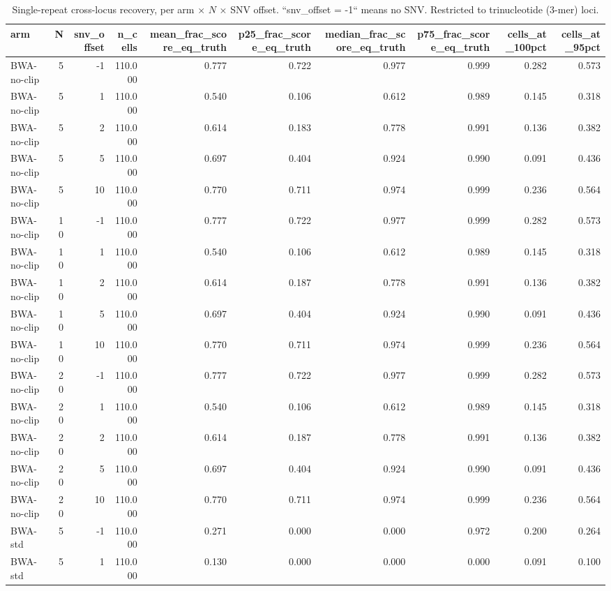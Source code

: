 \begin{table}
\caption{Single-repeat cross-locus recovery, per arm × $N$ × SNV offset.  ``snv\_offset = -1`` means no SNV.  Restricted to trinucleotide (3-mer) loci.}
\label{tab:single-recovery-by-N-snv}
\begin{tabular}{lrrrrrrrrr}
\toprule
arm & N & snv_offset & n_cells & mean_frac_score_eq_truth & p25_frac_score_eq_truth & median_frac_score_eq_truth & p75_frac_score_eq_truth & cells_at_100pct & cells_at_95pct \\
\midrule
BWA-no-clip & 5 & -1 & 110.000 & 0.777 & 0.722 & 0.977 & 0.999 & 0.282 & 0.573 \\
BWA-no-clip & 5 & 1 & 110.000 & 0.540 & 0.106 & 0.612 & 0.989 & 0.145 & 0.318 \\
BWA-no-clip & 5 & 2 & 110.000 & 0.614 & 0.183 & 0.778 & 0.991 & 0.136 & 0.382 \\
BWA-no-clip & 5 & 5 & 110.000 & 0.697 & 0.404 & 0.924 & 0.990 & 0.091 & 0.436 \\
BWA-no-clip & 5 & 10 & 110.000 & 0.770 & 0.711 & 0.974 & 0.999 & 0.236 & 0.564 \\
BWA-no-clip & 10 & -1 & 110.000 & 0.777 & 0.722 & 0.977 & 0.999 & 0.282 & 0.573 \\
BWA-no-clip & 10 & 1 & 110.000 & 0.540 & 0.106 & 0.612 & 0.989 & 0.145 & 0.318 \\
BWA-no-clip & 10 & 2 & 110.000 & 0.614 & 0.187 & 0.778 & 0.991 & 0.136 & 0.382 \\
BWA-no-clip & 10 & 5 & 110.000 & 0.697 & 0.404 & 0.924 & 0.990 & 0.091 & 0.436 \\
BWA-no-clip & 10 & 10 & 110.000 & 0.770 & 0.711 & 0.974 & 0.999 & 0.236 & 0.564 \\
BWA-no-clip & 20 & -1 & 110.000 & 0.777 & 0.722 & 0.977 & 0.999 & 0.282 & 0.573 \\
BWA-no-clip & 20 & 1 & 110.000 & 0.540 & 0.106 & 0.612 & 0.989 & 0.145 & 0.318 \\
BWA-no-clip & 20 & 2 & 110.000 & 0.614 & 0.187 & 0.778 & 0.991 & 0.136 & 0.382 \\
BWA-no-clip & 20 & 5 & 110.000 & 0.697 & 0.404 & 0.924 & 0.990 & 0.091 & 0.436 \\
BWA-no-clip & 20 & 10 & 110.000 & 0.770 & 0.711 & 0.974 & 0.999 & 0.236 & 0.564 \\
BWA-std & 5 & -1 & 110.000 & 0.271 & 0.000 & 0.000 & 0.972 & 0.200 & 0.264 \\
BWA-std & 5 & 1 & 110.000 & 0.130 & 0.000 & 0.000 & 0.000 & 0.091 & 0.100 \\

\end{tabular}
\end{table}
